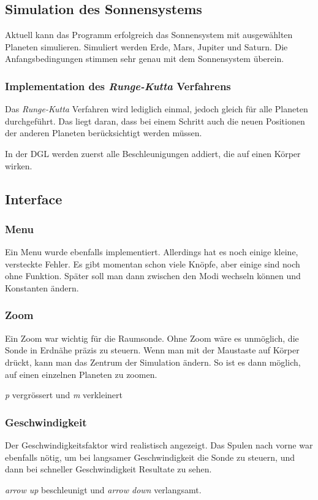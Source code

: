\documentclass{article}
\begin{document}
\subsection{Simulation des Sonnensystems}
Aktuell kann das Programm erfolgreich das Sonnensystem mit ausgewählten Planeten simulieren. Simuliert werden Erde, Mars, Jupiter und Saturn. Die Anfangsbedingungen stimmen sehr genau mit dem Sonnensystem überein.
\subsubsection{Implementation des \textit{Runge-Kutta }Verfahrens}
Das \textit{Runge-Kutta} Verfahren wird lediglich einmal, jedoch gleich für alle Planeten durchgeführt. Das liegt daran, dass bei einem Schritt auch die neuen Positionen der anderen Planeten berücksichtigt werden müssen.

In der DGL werden zuerst alle Beschleunigungen addiert, die auf einen Körper wirken.
\subsection{Interface}
\subsubsection{Menu}
Ein Menu wurde ebenfalls implementiert. Allerdings hat es noch einige kleine, versteckte Fehler. Es gibt momentan schon viele Knöpfe, aber einige sind noch ohne Funktion. Später soll man dann zwischen den Modi wechseln können und Konstanten ändern.
\subsubsection{Zoom}
Ein Zoom war wichtig für die Raumsonde. Ohne Zoom wäre es unmöglich, die Sonde in Erdnähe präzis zu steuern. Wenn man mit der Maustaste auf Körper drückt, kann man das Zentrum der Simulation ändern. So ist es dann möglich, auf einen einzelnen Planeten zu zoomen.

\textit{p} vergrössert und \textit{m} verkleinert
\subsubsection{Geschwindigkeit}
Der Geschwindigkeitsfaktor wird realistisch angezeigt. Das Spulen nach vorne war ebenfalls nötig, um bei langsamer Geschwindigkeit die Sonde zu steuern, und dann bei schneller Geschwindigkeit Resultate zu sehen.

\textit{arrow up} beschleunigt und \textit{arrow down} verlangsamt.
\end{document}
